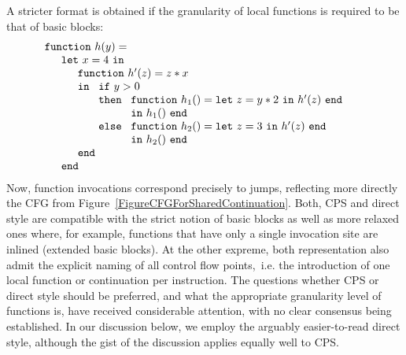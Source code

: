 A stricter format is obtained if the granularity of local functions is
required to be that of basic blocks:
\begin{equation}
\label{DirectStyleCode2}
\begin{array}{l}
\mathtt{function}\ h (y) =\\
\quad
  \begin{array}{l}
    \mathtt{let}\ x=4\ \mathtt{in} \\
    \quad \begin{array}{l}
            \mathtt{function}\ h' (z) = z*x \\
            \mathtt{in}\
                \begin{array}[t]{l}
                  \mathtt{if}\ y>0\\
                  \mathtt{then}\ 
                     \begin{array}[t]{l}
                        \mathtt{function}\ h_1 () = \mathtt{let}\
                              z = y*2\ \mathtt{in}\ h'(z)\ \mathtt{end}\\
                        \mathtt{in}\ h_1()\ \mathtt{end}
                     \end{array}\\
                  \mathtt{else}\ 
                     \begin{array}[t]{l}
                        \mathtt{function}\ h_2 () = \mathtt{let}\
                              z = 3\ \mathtt{in}\ h'(z)\ \mathtt{end}\\
                        \mathtt{in}\ h_2()\ \mathtt{end}
                     \end{array}
                \end{array}\\
            \mathtt{end}
          \end{array} \\
    \mathtt{end}
  \end{array}
\end{array}
\end{equation} 
Now, function invocations correspond precisely to jumps, reflecting
more directly the CFG from
Figure~\ref{FigureCFGForSharedContinuation}.  Both, CPS and direct
style are compatible with the strict notion of basic blocks as well as
more relaxed ones where, for example, functions that have only a
single invocation site are inlined (extended basic blocks). At the
other expreme, both representation also admit the explicit naming of
all control flow points,~i.e. the introduction of one local function
or continuation per instruction.  The questions whether CPS or direct
style should be preferred, and what the appropriate granularity level
of functions is, have received considerable attention, with no clear
consensus being established. In our discussion below, we employ the
arguably easier-to-read direct style, although the gist of the
discussion applies equally well to CPS.

